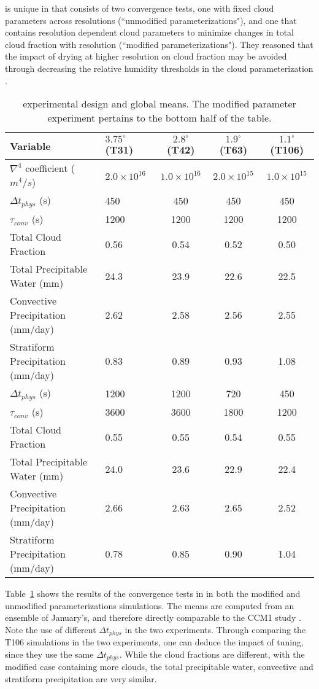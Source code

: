 \cite{WETAL1995CD} is unique in that consists of two convergence tests, one with fixed cloud parameters across resolutions (``unmodified parameterizations"), and one that contains resolution dependent cloud parameters to minimize changes in total cloud fraction with resolution (``modified parameterizations"). They reasoned that the impact of drying at higher resolution on cloud fraction may be avoided through decreasing the relative humidity thresholds in the cloud parameterization \citep{KETAL1994JGR}. 

 \begin{table}
 \caption{\cite{WETAL1995CD} experimental design and global means. The modified parameter experiment pertains to the bottom half of the table.}
 \centering
 \scriptsize
 \begin{tabular}{llccc}
 \hline
 Variable & $3.75^{\circ}$ (T31) & $2.8^{\circ}$ (T42) & $1.9^{\circ}$ (T63)  & $1.1^{\circ}$ (T106) \\
 \hline
   $\nabla^{4}$ coefficient ($m^4/s$) & $2.0 \times 10^{16}$ & $1.0 \times 10^{16}$ & $2.0 \times 10^{15}$ & $1.0 \times 10^{15}$ \\
   $\Delta t_{phys}$ (s) & 450 & 450 & 450 & 450 \\
   $\tau_{conv}$ (s) & 1200 & 1200 & 1200 & 1200 \\   
   Total Cloud Fraction & 0.56 & 0.54 & 0.52 & 0.50 \\
   Total Precipitable Water (mm) & 24.3 & 23.9 & 22.6 & 22.5 \\
   Convective Precipitation (mm/day) & 2.62 & 2.58 & 2.56 & 2.55 \\
   Stratiform Precipitation (mm/day) & 0.83 & 0.89 & 0.93 & 1.08 \\  
   \hline
   $\Delta t_{phys}$ (s) & 1200 & 1200 & 720 & 450 \\
   $\tau_{conv}$ (s) & 3600 & 3600 & 1800 & 1200 \\
   Total Cloud Fraction & 0.55 & 0.55 & 0.54 & 0.55 \\
   Total Precipitable Water (mm) & 24.0 & 23.6 & 22.9 & 22.4 \\
   Convective Precipitation (mm/day) & 2.66 & 2.63 & 2.65 & 2.52 \\
   Stratiform Precipitation (mm/day) & 0.78 & 0.85 & 0.90 & 1.04 \\    
 \hline
 \end{tabular}
 \label{tbl:table1-2}
 \end{table}

Table~\ref{tbl:table1-2} shows the results of the convergence tests in \cite{WETAL1995CD} in both the modified and unmodified parameterizations simulations. The means are computed from an ensemble of January's, and therefore directly comparable to the CCM1 study \citep{KW1991JGR}. Note the use of different $\Delta t_{phys}$ in the two experiments. Through comparing the T106 simulations in the two experiments, one can deduce the impact of tuning, since they use the same $\Delta t_{phys}$. While the cloud fractions are different, with the modified case containing more clouds, the total precipitable water, convective and stratiform precipitation are very similar. 

